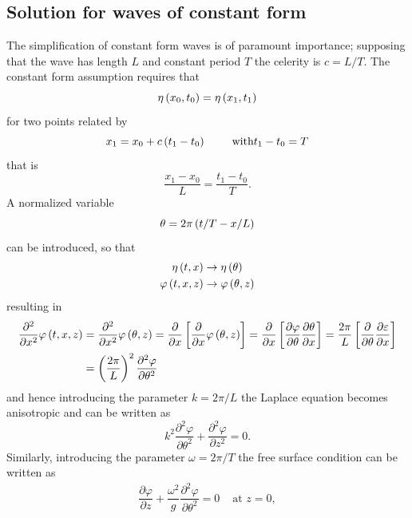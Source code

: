 \subsection{Solution for waves of constant form}\label{solution}
The simplification of constant form waves is of paramount importance; supposing that the wave has length $L$ and constant period $T$ the celerity is $c=L/T$. The constant form assumption requires that
\begin{equation*}
\eta\left( x_{0},t_{0} \right)=\eta\left( x_{1},t_{1} \right)
\end{equation*}
for two points related by 
\begin{equation*}
x_{1}=x_{0}+c\left( t_{1}-t_{0} \right) \qquad \text{ with} t_{1}-t_{0}=T
\end{equation*}
that is
\begin{equation*}
\dfrac{x_{1}-x_{0}}{L}=\dfrac{t_{1}-t_{0}}{T}.
\end{equation*}
A normalized variable
\begin{equation}
\theta=2\pi\left( t/T-x/L \right)
\end{equation}
can be introduced, so that
\begin{align*}
\eta\left( t,x \right)&\rightarrow \eta\left( \theta \right)\\
\varphi\left( t,x,z \right)&\rightarrow \varphi\left( \theta,z \right)
\end{align*}
resulting in 
\begin{align*}
\dfrac{\partial^{2}}{\partial x^{2}}\varphi\left( t,x,z \right)&=\dfrac{\partial^{2}}{\partial x^{2}}\varphi\left( \theta,z \right)=\dfrac{\partial}{\partial x}\left[ \dfrac{\partial}{\partial x}\varphi\left( \theta,z \right) \right]=\dfrac{\partial}{\partial x}\left[ \dfrac{\partial\varphi}{\partial\theta}\dfrac{\partial\theta}{\partial x} \right]=\dfrac{2\pi}{L}\left[ \dfrac{\partial}{\partial\theta}\dfrac{\partial\varepsilon}{\partial x} \right]\\
&=\left( \dfrac{2\pi}{L} \right)^{2}\dfrac{\partial^{2}\varphi}{\partial\theta^{2}}
\end{align*}
and hence introducing the parameter $k=2\pi/L$ the Laplace equation becomes anisotropic and can be written as
\begin{equation}
k^{2}\dfrac{\partial^{2}\varphi}{\partial\theta^{2}}+\dfrac{\partial^{2}\varphi}{\partial z^{2}}=0.
\end{equation}
Similarly, introducing the parameter $\omega=2\pi/T$ the free surface condition can be written as
\begin{equation}
\begin{array}{ll}
\dfrac{\partial\varphi}{\partial z}+\dfrac{\omega^{2}}{g}\dfrac{\partial^{2}\varphi}{\partial\theta^{2}}=0 & \text{ at } z=0,
\end{array}
\end{equation}
